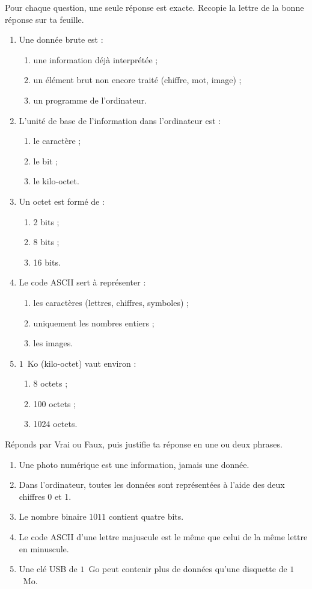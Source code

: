 \documentclass[11pt]{article}
\newcommand{\cle}[1]{{\popxbold\color{popdark}#1}}
\begin{document}
\begin{exercice}
Pour chaque question, une seule réponse est exacte. Recopie la lettre de la bonne réponse sur ta feuille.
\begin{enumerate}
\item Une \cle{donnée brute} est :
\begin{enumerate}
\item une information déjà interprétée ;
\item un élément brut non encore traité (chiffre, mot, image) ;
\item un programme de l'ordinateur.
\end{enumerate}
\item L'unité de base de l'information dans l'ordinateur est :
\begin{enumerate}
\item le caractère ; \item le bit ; \item le kilo-octet.
\end{enumerate}
\item Un octet est formé de :
\begin{enumerate}
\item 2 bits ; \item 8 bits ; \item 16 bits.
\end{enumerate}
\item Le code \cle{ASCII} sert à représenter :
\begin{enumerate}
\item les caractères (lettres, chiffres, symboles) ;
\item uniquement les nombres entiers ;
\item les images.
\end{enumerate}
\item $1$~Ko (kilo-octet) vaut environ :
\begin{enumerate}
\item 8 octets ; \item 100 octets ; \item 1024 octets.
\end{enumerate}
\end{enumerate}
\end{exercice}

\begin{exercice}
Réponds par Vrai ou Faux, puis justifie ta réponse en une ou deux phrases.
\begin{enumerate}
\item Une photo numérique est une information, jamais une donnée.
\item Dans l'ordinateur, toutes les données sont représentées à l'aide des deux chiffres 0 et 1.
\item Le nombre binaire $1011$ contient quatre bits.
\item Le code ASCII d'une lettre majuscule est le même que celui de la même lettre en minuscule.
\item Une clé USB de $1$~Go peut contenir plus de données qu'une disquette de $1$~Mo.
\end{enumerate}
\end{exercice}
\end{document}
